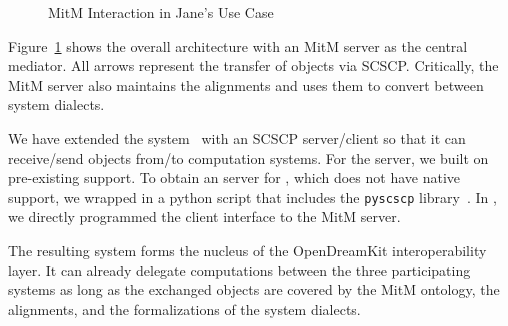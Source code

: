 \begin{figure}[ht]\centering\vspace*{-1em}
  \caption{MitM Interaction in Jane's Use Case}\label{fig:mitmpoc}\vspace*{-1em}
\end{figure}

Figure~\ref{fig:mitmpoc} shows the overall architecture with an MitM server as the central mediator.
All arrows represent the transfer of \OMMT objects via SCSCP.
Critically, the MitM server also maintains the alignments and uses them to convert between system dialects.

We have extended the \MMT system~\cite{Rabe:MAGMS13} with an SCSCP server/client so that it can receive/send objects from/to computation systems.
For the \GAP server, we built on pre-existing \SCSCP support.
To obtain an \SCSCP server for \Singular, which does not have native \SCSCP support, we wrapped \Singular in a python script that includes the \lstinline|pyscscp| library~\cite{py-scscp:on}.
In \Sage, we directly programmed the client interface to the MitM server. 

The resulting system forms the nucleus of the OpenDreamKit interoperability layer. It can already delegate computations between the three participating systems as long as the exchanged objects are covered by the MitM ontology, the alignments, and the formalizations of the system dialects.

